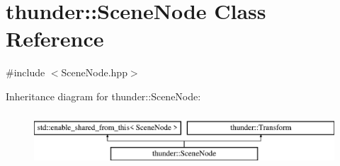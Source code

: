 \hypertarget{classthunder_1_1_scene_node}{}\section{thunder\+:\+:Scene\+Node Class Reference}
\label{classthunder_1_1_scene_node}


{\ttfamily \#include $<$Scene\+Node.\+hpp$>$}

Inheritance diagram for thunder\+:\+:Scene\+Node\+:\begin{figure}[H]
\begin{center}
\leavevmode
\includegraphics[height=2.000000cm]{classthunder_1_1_scene_node}
\end{center}
\end{figure}
